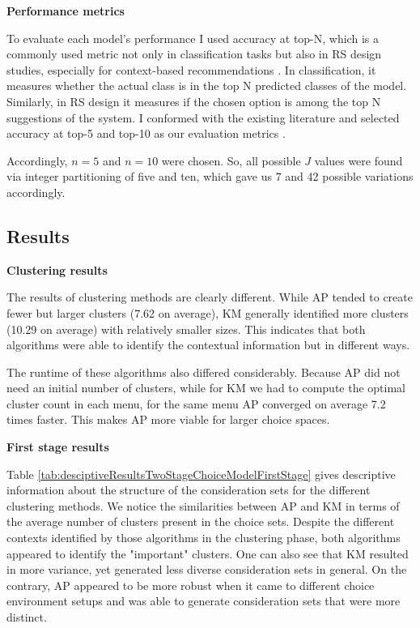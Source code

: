 \documentclass[a4paper,12pt]{article}
\begin{document}
\textbf{Performance metrics}

To evaluate each model's performance I used accuracy at top-N, which is a commonly used metric not only in classification tasks but also in RS design studies, especially for context-based recommendations \citep{ricci2010recsystems}. In classification, it measures whether the actual class is in the top N predicted classes of the model. Similarly, in RS design it measures if the chosen option is among the top N suggestions of the system. I conformed with the existing literature and selected accuracy at top-5 and top-10 as our evaluation metrics \cite{cremonesi2010performance}. 

Accordingly,  $n = 5$ and $n = 10$ were chosen. So, all possible $J$ values were found via integer partitioning of five and ten, which gave us 7 and 42 possible variations accordingly.

\subsection{Results}

\textbf{Clustering results}
    
The results of clustering methods are clearly different. While AP tended to create fewer but larger clusters (7.62 on average), KM generally identified more clusters (10.29 on average)  with relatively smaller sizes. This indicates that both algorithms were able to identify the contextual information but in different ways. 

The runtime of these algorithms also differed considerably. Because AP did not need an initial number of clusters, while for KM we had to compute the optimal cluster count in each menu, for the same menu AP converged on average 7.2 times faster. This makes AP more viable for larger choice spaces.

\textbf{First stage results}

Table \ref{tab:desciptiveResultsTwoStageChoiceModelFirstStage} gives descriptive information about the structure of the consideration sets for the different clustering methods. We notice the similarities between AP and KM in terms of the average number of clusters present in the choice sets. Despite the different contexts identified by those algorithms in the clustering phase, both algorithms appeared to identify the "important" clusters. One can also see that KM resulted in more variance, yet generated less diverse consideration sets in general. On the contrary, AP appeared to be more robust when it came to different choice environment setups and was able to generate consideration sets that were more distinct. 
\end{document}
